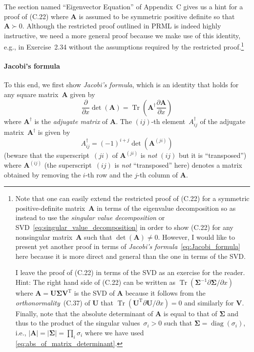 \documentclass[12pt,a4paper]{article}
\newcommand{\parhead}[1]{%
\paragraph{#1}
\addcontentsline{toc}{subsubsection}{#1}}
\begin{document}
The section named ``Eigenvector Equation'' of Appendix~C gives us a hint for a proof of (C.22)
where $\mathbf{A}$ is assumed to be symmetric positive definite so that $\mathbf{A} \succ 0$.
Although the restricted proof outlined in PRML is indeed highly instructive,
we need a more general proof because we make use of this identity, e.g., in Exercise~2.34
without the assumptions required by the restricted proof.\footnote{%
Note that one can easily extend
the restricted proof of (C.22) for a symmetric positive-definite matrix~$\mathbf{A}$
in terms of the eigenvalue decomposition
so as instead to use the \emph{singular value decomposition} or
SVD~\eqref{eq:singular_value_decomposition}
in order to show (C.22) for any nonsingular matrix~$\mathbf{A}$
such that $\operatorname{det}(\mathbf{A}) \neq 0$.
However, I would like to present yet another proof
in terms of \emph{Jacobi's formula}~\eqref{eq:Jacobi_formula} here
because it is more direct and general than the one in terms of the SVD.

I leave the proof of (C.22) in terms of the SVD as an exercise for the reader.
Hint: The right hand side of (C.22) can be written as
$\operatorname{Tr}\left(\bm{\Sigma}^{-1}\partial\bm{\Sigma}/\partial x\right)$
where $\mathbf{A} = \mathbf{U}\bm{\Sigma}\mathbf{V}^{\operatorname{T}}$ is the SVD of $\mathbf{A}$
because it follows from the \emph{orthonormality}~(C.37) of $\mathbf{U}$ that
$\operatorname{Tr}(\mathbf{U}^{\operatorname{T}}\partial\mathbf{U}/\partial x) = 0$
and similarly for $\mathbf{V}$.
Finally, note that the absolute determinant of $\mathbf{A}$ is equal to that of $\bm{\Sigma}$ and
thus to the product of the singular values~$\sigma_i > 0$ such that
$\bm{\Sigma} = \operatorname{diag}\left( \sigma_i \right)$, i.e.,
$\left|\mathbf{A}\right| = \left|\bm{\Sigma}\right| = \prod_i \sigma_i$
where we have used \eqref{eq:abs_of_matrix_determinant}.}

\parhead{Jacobi's formula}
To this end, we first show \emph{Jacobi's formula},
which is an identity that holds for any square matrix~$\mathbf{A}$ given by
\begin{equation}
\frac{\partial}{\partial x} \operatorname{det}\left(\mathbf{A}\right) =
\operatorname{Tr}\left(\mathbf{A}^{\dagger}\frac{\partial\mathbf{A}}{\partial x}\right)
\label{eq:Jacobi_formula}
\end{equation}
where $\mathbf{A}^{\dagger}$ is the \emph{adjugate matrix} of
$\mathbf{A}$.
The $(ij)$-th element~$A_{ij}^{\dagger}$ of the adjugate matrix~$\mathbf{A}^{\dagger}$ is given by
\begin{equation}
A_{ij}^{\dagger} = (-1)^{i+j} \operatorname{det}\left(\mathbf{A}^{(ji)}\right)
\label{eq:definition_of_adjugate}
\end{equation}
(beware that the superscript~$(ji)$ of $\mathbf{A}^{(ji)}$ is \emph{not} $(ij)$ but
it is ``transposed'')
where $\mathbf{A}^{(ij)}$ (the superscript~$(ij)$ is \emph{not} ``transposed'' here)
denotes a matrix obtained by removing
the $i$-th row and the $j$-th column of $\mathbf{A}$.
\end{document}
